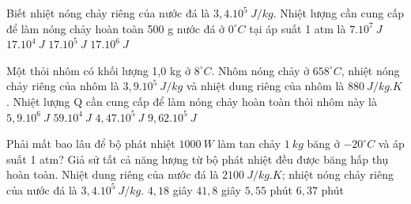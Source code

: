 \begin{vidu}%
	Biết nhiệt nóng chảy riêng của nước đá là $3,4.10^5\ J/kg$. Nhiệt lượng cần cung cấp để làm nóng chảy hoàn toàn 500 g nước đá ở $0^\circ C$ tại áp suất 1 atm là
	\choice
	{$7.10^7\ J$}
	{\True $17.10^4\ J$}
	{$17.10^5\ J$}
	{$17.10^6\ J$}
	\end{vidu}

\begin{vidu}%
	Một thỏi nhôm có khối lượng 1,0 kg ở $8^\circ C$.  Nhôm nóng chảy ở $658^\circ C$, nhiệt nóng chảy riêng của nhôm là $3,9.10^5\ J/kg$ và nhiệt dung riêng của nhôm là $880\ J/kg.K$. Nhiệt lượng Q cần cung cấp để làm nóng chảy hoàn toàn thỏi nhôm này là
	\choice
	{$5,9.10^6\ J$}
	{$59.10^4\ J$}
	{$4,47.10^5\ J$}
	{\True $9,62.10^5\ J$}
	\end{vidu}
\begin{vidu} 
	Phải mất bao lâu để bộ phát nhiệt $1000 \ W$ làm tan chảy $1 \ kg$ băng ở $-20^\circ C$ và áp suất 1 atm? Giả sử tất cả năng lượng từ bộ phát nhiệt đều được băng hấp thụ hoàn toàn. Nhiệt dung riêng của nước đá là $2100 \ J /kg.K$; nhiệt nóng chảy riêng của nước đá là $3,4 . 10^{5} \ J / kg$. 
	\choice
	{$4,18$ giây}
	{$41,8$ giây}
	{$5,55$ phút}
	{\True $6,37$ phút}
\end{vidu}




